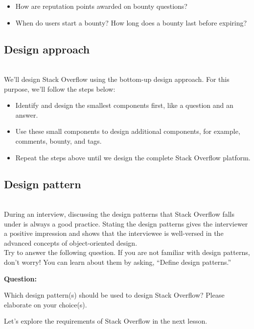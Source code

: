 \begin{itemize}
\item
\protect{}\label{LmibANtZf6dkKQB-U8r9p}
How are reputation points awarded on bounty questions?
\item
\protect{}\label{0VqQifyO4jggAOlUsDhFZ}
When do users start a bounty? How long does a bounty last before expiring?
\end{itemize}

\subsection{Design approach}\label{CO1fw12Xo70xkjutOggV4}
\\
We'll design Stack Overflow using the bottom-up design approach. For this purpose, we'll follow the steps below:

\begin{itemize}
\item
\protect{}\label{ByYcv-pn7JeASQylc14uB}
Identify and design the smallest components first, like a question and an answer.
\item
\protect{}\label{AvLb9h3XA4DF8t5lzMuWV}
Use these small components to design additional components, for example, comments, bounty, and tags.
\item
\protect{}\label{rnv70plguM8-4gFNgLDjh}
Repeat the steps above until we design the complete Stack Overflow platform.
\end{itemize}

\subsection{Design pattern~}\label{wYLoSVzV9FNni3Zr6G0Ou}
\\
During an interview, discussing the design patterns that Stack Overflow falls under is always a good practice. Stating the design patterns gives the interviewer a positive impression and shows that the interviewee is well-versed in the advanced concepts of object-oriented design.
\\
Try to answer the following question. If you are not familiar with design patterns, don't worry! You can learn about them by asking, ``Define design patterns.''

\textbf{Question:}

Which design pattern(s) should be used to design Stack Overflow? Please elaborate on your choice(s).

Let's explore the requirements of Stack Overflow in the next lesson.

